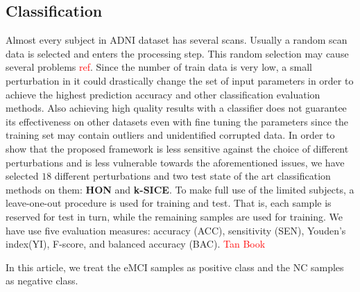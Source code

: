 \documentclass[journal]{IEEEtran}
\begin{document}
	
	
	\subsection{Classification}
	
	Almost every subject in ADNI dataset has several scans. Usually a random scan data is selected and enters the processing step. This random selection may cause several problems \textcolor{red}{ref}. Since the number of train data is very low, a small perturbation in it could drastically change the set of input parameters in order to achieve the highest prediction accuracy and other classification evaluation methods. Also achieving high quality results with a classifier does not guarantee its effectiveness on other datasets even with fine tuning the parameters since the training set may contain outliers and unidentified corrupted data. 
	In order to show that the proposed framework is less sensitive against the choice of different perturbations and is less vulnerable towards the aforementioned issues, we have selected $18$ different perturbations and two test state of the art classification methods on them: \textbf{HON} and \textbf{k-SICE}.   
	To make full use of the limited subjects, a leave-one-out procedure is used for training and test. That is, each sample is reserved for test in turn, while the remaining samples are used for training.
	We have use five
	evaluation measures: accuracy (ACC), sensitivity (SEN), Youden’s index(YI), F-score, and balanced accuracy (BAC).
	\textcolor{red}{Tan Book} 
	
	In this article, we treat the eMCI samples as positive class and the NC samples as negative class.
	
\end{document}
